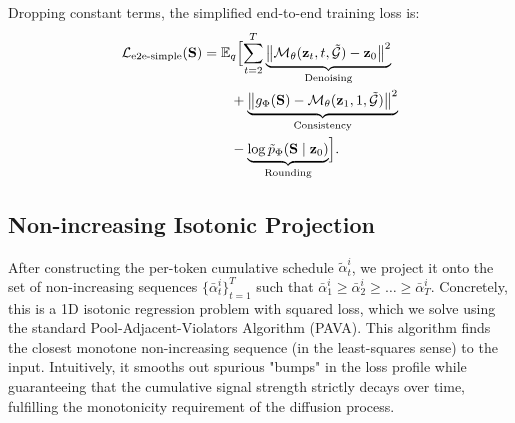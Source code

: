 Dropping constant terms, the simplified end-to-end training loss is:
\begin{equation}
\begin{aligned}
\mathcal{L}_{\text{e2e-simple}}(\mathbf{S})
&=
\mathbb{E}_{q}
\Bigl[
    \sum_{t=2}^{T}
    \underbrace{
        \bigl\|
            \mathcal{M}_\theta(\mathbf{z}_t, t, \tilde{\mathcal{G}})
            - \mathbf{z}_0
        \bigr\|^2
    }_{\text{Denoising}}
\\
&\qquad+
    \underbrace{
        \bigl\|
            g_\Phi(\mathbf{S})
            - \mathcal{M}_\theta(\mathbf{z}_1, 1, \tilde{\mathcal{G}})
        \bigr\|^2
    }_{\text{Consistency}}
\\
&\qquad-
    \underbrace{
        \log \tilde{p}_\Phi(\mathbf{S} \mid \mathbf{z}_0)
    }_{\text{Rounding}}
\Bigr].
\end{aligned}
\end{equation}




\subsection{Non-increasing Isotonic Projection}\label{projection}
After constructing the per-token cumulative schedule $\tilde{\alpha}^i_t$, we project it onto the set of non-increasing sequences $\{\bar{\alpha}^i_t\}_{t=1}^T$ such that $\bar{\alpha}^i_1 \ge \bar{\alpha}^i_2 \ge \dots \ge \bar{\alpha}^i_T$. Concretely, this is a 1D isotonic regression problem with squared loss, which we solve using the standard Pool-Adjacent-Violators Algorithm (PAVA). This algorithm finds the closest monotone non-increasing sequence (in the least-squares sense) to the input. Intuitively, it smooths out spurious "bumps" in the loss profile while guaranteeing that the cumulative signal strength strictly decays over time, fulfilling the monotonicity requirement of the diffusion process.

